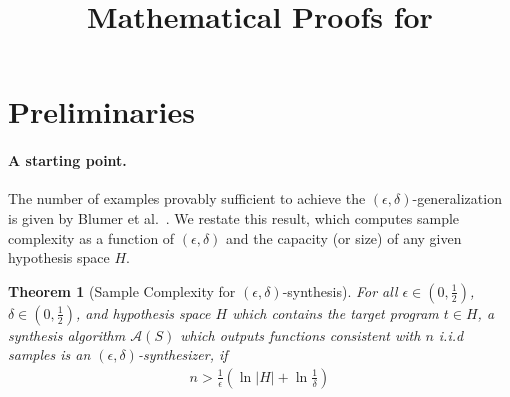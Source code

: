 \documentclass[11pt]{extarticle}
\title{Mathematical Proofs for \tool}
\newtheorem{theorem}{Theorem}[section]
\newcommand{\synthalgo}{\mathcal{A}(S)}
\newcommand{\etal}{et al.\xspace}
\begin{document}
\maketitle

\section{Preliminaries}

\paragraph{A starting point.} The number of examples provably sufficient to achieve the $(\epsilon, \delta)$-generalization is given by Blumer \etal~\cite{blumer1987occam}. We restate this result, which computes sample complexity as a function of $(\epsilon,\delta)$ and the capacity (or size) of any given hypothesis space $H$.

\begin{theorem}[Sample Complexity for $(\epsilon, \delta)$-synthesis]
  \label{thm:static-union-bound}
For all $\epsilon \in (0,\frac{1}{2})$, $\delta\in
(0,\frac{1}{2})$, and hypothesis space $H$ which contains the target program $t \in H$, a synthesis algorithm $\synthalgo$ which outputs functions consistent with $n$ i.i.d samples is an $(\epsilon, \delta)$-synthesizer, if 
\begin{align*}
  n > \frac{1}{\epsilon}(\ln |H| + \ln
  \frac{1}{\delta})
\end{align*}
\end{theorem}
\end{document}
